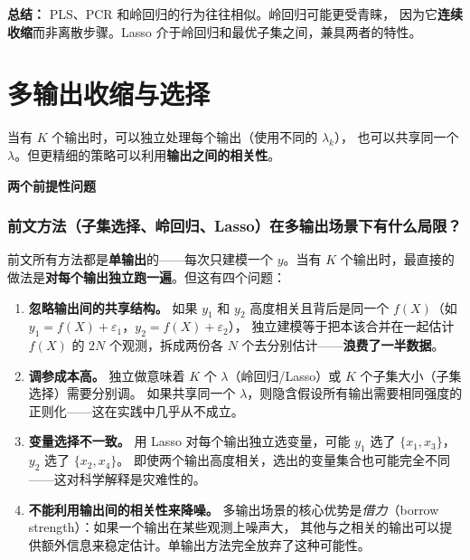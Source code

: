 \textbf{总结：} PLS、PCR 和岭回归的行为往往相似。岭回归可能更受青睐，
因为它\textbf{连续收缩}而非离散步骤。Lasso 介于岭回归和最优子集之间，兼具两者的特性。

\section{多输出收缩与选择}

当有 $K$ 个输出时，可以独立处理每个输出（使用不同的 $\lambda_k$），
也可以共享同一个 $\lambda$。但更精细的策略可以利用\textbf{输出之间的相关性}。

\medskip
\noindent
\textbf{两个前提性问题}

\subsubsection{前文方法（子集选择、岭回归、Lasso）在多输出场景下有什么局限？}

前文所有方法都是\textbf{单输出}的——每次只建模一个 $y$。当有 $K$ 个输出时，最直接的做法是\textbf{对每个输出独立跑一遍}。但这有四个问题：

\begin{enumerate}[label=(\arabic*), leftmargin=*]
    \item \textbf{忽略输出间的共享结构。}
    如果 $y_1$ 和 $y_2$ 高度相关且背后是同一个 $f(X)$（如 $y_1 = f(X) + \varepsilon_1$，$y_2 = f(X) + \varepsilon_2$），
    独立建模等于把本该合并在一起估计 $f(X)$ 的 $2N$ 个观测，拆成两份各 $N$ 个去分别估计——\textbf{浪费了一半数据}。

    \item \textbf{调参成本高。}
    独立做意味着 $K$ 个 $\lambda$（岭回归/Lasso）或 $K$ 个子集大小（子集选择）需要分别调。
    如果共享同一个 $\lambda$，则隐含假设所有输出需要相同强度的正则化——这在实践中几乎从不成立。

    \item \textbf{变量选择不一致。}
    用 Lasso 对每个输出独立选变量，可能 $y_1$ 选了 $\{x_1, x_3\}$，$y_2$ 选了 $\{x_2, x_4\}$。
    即使两个输出高度相关，选出的变量集合也可能完全不同——这对科学解释是灾难性的。

    \item \textbf{不能利用输出间的相关性来降噪。}
    多输出场景的核心优势是\emph{借力}（borrow strength）：如果一个输出在某些观测上噪声大，
    其他与之相关的输出可以提供额外信息来稳定估计。单输出方法完全放弃了这种可能性。
\end{enumerate}

